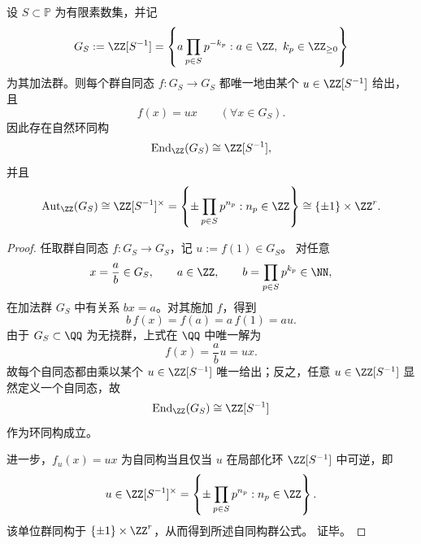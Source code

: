 \begin{theorem}[局部化数系的自同态环与自同构群完全显式]\label{thm:xi-localized-integers-endomorphism-automorphism-explicit}
设 \(S\subset\mathbb P\) 为有限素数集，并记
\[
G_S:=\ZZ[S^{-1}]
=
\left\{
a\prod_{p\in S}p^{-k_p}
:
a\in\ZZ,\ k_p\in \ZZ_{\ge 0}
\right\}
\]
为其加法群。则每个群自同态 \(f:G_S\to G_S\) 都唯一地由某个 \(u\in \ZZ[S^{-1}]\) 给出，且
\[
f(x)=ux
\qquad
(\forall x\in G_S).
\]
因此存在自然环同构
\[
\operatorname{End}_{\ZZ}(G_S)\cong \ZZ[S^{-1}],
\]
并且
\[
\operatorname{Aut}_{\ZZ}(G_S)
\cong
\ZZ[S^{-1}]^\times
=
\left\{\pm\prod_{p\in S}p^{n_p}: n_p\in\ZZ\right\}
\cong
\{\pm1\}\times \ZZ^{r}.
\]
\end{theorem}
\begin{proof}
任取群自同态 \(f:G_S\to G_S\)，记
\(
u:=f(1)\in G_S
\)。
对任意
\[
x=\frac{a}{b}\in G_S,
\qquad
a\in\ZZ,
\qquad
b=\prod_{p\in S}p^{k_p}\in \NN,
\]
在加法群 \(G_S\) 中有关系 \(bx=a\)。对其施加 \(f\)，得到
\[
b\,f(x)=f(a)=a\,f(1)=au.
\]
由于 \(G_S\subset \QQ\) 为无挠群，上式在 \(\QQ\) 中唯一解为
\[
f(x)=\frac{a}{b}u=ux.
\]
故每个自同态都由乘以某个 \(u\in \ZZ[S^{-1}]\) 唯一给出；反之，任意 \(u\in \ZZ[S^{-1}]\) 显然定义一个自同态，故
\[
\operatorname{End}_{\ZZ}(G_S)\cong \ZZ[S^{-1}]
\]
作为环同构成立。

进一步，\(f_u(x)=ux\) 为自同构当且仅当 \(u\) 在局部化环 \(\ZZ[S^{-1}]\) 中可逆，即
\[
u\in \ZZ[S^{-1}]^\times
=
\left\{\pm\prod_{p\in S}p^{n_p}: n_p\in\ZZ\right\}.
\]
该单位群同构于 \(\{\pm1\}\times \ZZ^r\)，从而得到所述自同构群公式。
证毕。
\end{proof}

